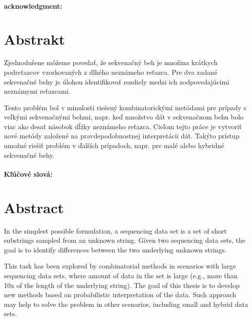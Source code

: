 \documentclass[12pt, oneside]{book}
\begin{document}

\frontmatter

\setcounter{page}{3}
\newpage 
~

\vfill
{\bf acknowledgment:}


\newpage 
\section*{Abstrakt}
Zjednodušene môžeme povedať, že sekvenačný beh je množina krátkych podreťazcov vzorkovaných z dlhého neznámeho reťazca. 
Pre dva zadané sekvenačné behy je úlohou identifikovať rozdiely medzi ich zodpovedajúcimi neznámymi reťazcami.

Tento problém bol v minulosti riešený kombinatorickými metódami pre prípady s veľkými sekvenačnými behmi, 
napr. keď množstvo dát v sekvenačnom behu bolo viac ako desať násobok dĺžky neznámeho reťazca. 
Cieľom tejto práce je vytvoriť nové metódy založené na pravdepodobnostnej interpretácii dát. 
Takýto prístup umožné riešiť problém v ďalších prípadoch, napr. pre malé alebo hybridné sekvenačné behy.

\paragraph*{Kľúčové slová:} %


\newpage 
\section*{Abstract}
In the simplest possible formulation, a sequencing data set is a set of short substrings sampled from an unknown string. Given two sequencing data sets, the goal is to identify differences between the two underlying unknown strings.

This task has been explored by combinatorial methods in scenarios with large sequencing data sets, where amount of data in the set is large (e.g., more than 10x of the length of the underlying string). The goal of this thesis is to develop new methods based on probabilistic interpretation of the data. Such approach may help to solve the problem in other scenarios, including small and hybrid data sets.
\end{document}
